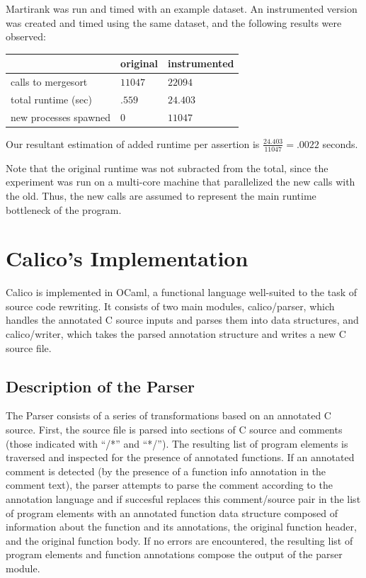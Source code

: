 \documentclass[notitlepage]{article}
\begin{document}
Martirank was run and timed with an example dataset. An instrumented version was created and timed using the same dataset, and the following results were observed:

\begin{tabular}{l | l | l}
& original & instrumented \\ \hline
calls to mergesort & $11047$ & $22094$ \\
total runtime (sec) & $.559$ & $24.403$ \\
new processes spawned & 0 & $11047$
\end{tabular}

Our resultant estimation of added runtime per assertion is $\frac{24.403}{11047} = {\mathbf .0022}$ seconds.

Note that the original runtime was not subracted from the total, since the experiment was run on a multi-core machine that parallelized the new calls with the old. Thus, the new calls are assumed to represent the main runtime bottleneck of the program.

\section{Calico's Implementation}

Calico is implemented in OCaml, a functional language well-suited to the task of source code rewriting. It consists of two main modules, calico/parser, which handles the annotated C source inputs and parses them into data structures, and calico/writer, which takes the parsed annotation structure and writes a new C source file.

\subsection{Description of the Parser}

The Parser consists of a series of transformations based on an annotated C source. First, the source file is parsed into sections of C source and comments (those indicated with ``/*'' and ``*/''). The resulting list of program elements is traversed and inspected for the presence of annotated functions. If an annotated comment is detected (by the presence of a function info annotation in the comment text), the parser attempts to parse the comment according to the annotation language and if succesful replaces this comment/source pair in the list of program elements with an annotated function data structure composed of information about the function and its annotations, the original function header, and the original function body. If no errors are encountered, the resulting list of program elements and function annotations compose the output of the parser module.
\end{document}
